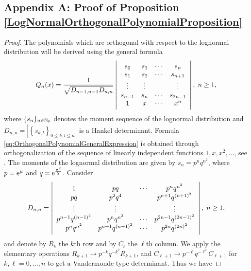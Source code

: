 \begin{subappendices}
\section*{Appendix A: Proof of Proposition \ref{LogNormalOrthogonalPolynomialProposition}}
\begin{proof}
The polynomials which are orthogonal with respect to the lognormal distribution will be derived using the general formula
\begin{equation}\label{eq:OrthogonalPolynomialGeneralExpression}
Q_{n}(x)=\frac{1}{\sqrt{D_{n-1,n-1}D_{n,n}}}\displaystyle
\left| \begin{array}{cccc}
s_{0}&s_{1}&\cdots&s_{n} \\
s_{1}&s_{2}&\cdots&s_{n+1}  \\
\vdots&\vdots&&\vdots\\
s_{n-1}&s_{n}&\cdots&s_{2n-1}\\
1&x&\cdots&x^{n}
\end{array}
\right|,\hspace{0.1cm}n\geq1,
\end{equation}
where $\{s_{n}\}_{n\in\mathbb{N}_0}$ denotes the moment sequence of the lognormal distribution and  $D_{n,n}=\left|\left\{s_{k,l}\right\}_{0\leq k,l \leq n}\right|$ is a Hankel determinant. Formula \eqref{eq:OrthogonalPolynomialGeneralExpression} is obtained through orthogonalization of the sequence of linearly independent functions $1,x,x^{2},\ldots$, see \cite[pp.\ 26--27]{Sz39}. The moments of the lognormal distribution are given by $s_{n}=p^{n}q^{n^{2}}$, where $p=\mathrm{e}^{\mu}$ and $q=\mathrm{e}^{\frac{\sigma^{2}}{2}}$. Consider
\begin{equation}\label{eq:Dn1}
D_{n,n}=\displaystyle
\left| \begin{array}{cccc}
1&pq&\cdots&p^{n}q^{n^{2}} \\
pq&p^{2}q^{4}&&p^{n+1}q^{(n+1)^{2}}\\
\vdots&\vdots&&\vdots\\
p^{n-1}q^{(n-1)^{2}}&p^{n}q^{n^{2}}&\cdots&p^{2n-1}q^{(2n-1)^{2}}\\
p^{n}q^{n^{2}}&p^{n+1}q^{(n+1)^{2}}&\cdots&p^{2n}q^{(2n)^{2}}
\end{array}
\right|,\hspace{0.1cm}n\geq1,
\end{equation}
and denote by $R_{k}$ the $k$th row and by $C_{\ell}$ the $\ell$th column. We apply the elementary operations $R_{k+1}\rightarrow p^{-k}q^{-k^{2}}R_{k+1}$, and $C_{\ell+1}\rightarrow p^{-\ell}q^{-\ell^{2}}C_{\ell+1}$ for $k,\ell=0,\ldots,n$ to get a Vandermonde type determinant. Thus we have

\end{proof}
\end{subappendices}
